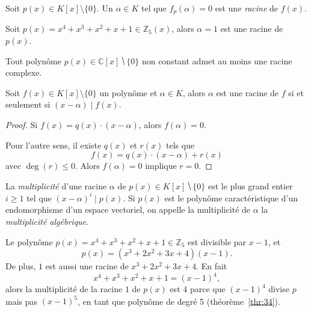 \begin{definition}
  \label{def:31}
  Soit $p(x) \in K[x] \setminus\{0\}$. Un $\alpha \in K$ tel que $f_p(\alpha) = 0$ est une  \emph{racine} de $f(x)$.  
\end{definition}


\begin{example}
  \label{exe:40}
  Soit $p(x) = x^4 + x^3 + x^2 + x + 1 ∈ ℤ_5(x)$, alors $α = 1$ est une racine de $p(x)$. 
\end{example}


\begin{theorem}
  \label{thr:44}
  Tout polynôme $p(x) ∈ℂ[x] ⧹\{0\}$ non constant admet au moins une racine complexe.
\end{theorem}




\begin{theorem}
  \label{thr:35}
  Soit $f(x)∈ K[x] \setminus \{0\}$ un polynôme  et $\alpha \in K$, alors $\alpha$ est une racine de $f$ si et seulement si $(x- \alpha)  \mid f(x)$. 
\end{theorem}

\begin{proof}
  Si $f(x) = q(x) \cdot (x - \alpha)$, alors $f(\alpha) = 0$. 

Pour l'autre sens, il existe $q(x)$ et $r(x)$ tels que
\begin{displaymath}
  f(x) = q(x) \cdot (x - \alpha) + r(x)
\end{displaymath}
avec $\deg(r) \leq 0$. Alors $f(\alpha) = 0$ implique $r=0$. 
\end{proof}


\begin{definition}
  \label{def:41}
  La \emph{multiplicité} d'une racine $α$ de $p(x) ∈ K[x] ⧹\{0\}$ est le plus grand entier $i≥1$ tel que $ (x-α)^i \mid p(x)$. Si $p(x)$ est le polynôme caractéristique d'un endomorphisme d'un espace vectoriel, on appelle la multiplicité de $α$ la \emph{multiplicité algébrique}. 
\end{definition} 


\begin{example}  
  \label{exe:45}
  Le polynôme  $p(x) = x^4 + x^3 + x^2 + x + 1  ∈ℤ_5$  est divisible par $x-1$, et
  \begin{displaymath}
    p(x)  = (x^3 + 2x^2 + 3x + 4)  (x-1). 
  \end{displaymath}
  De plus, $1$ est aussi une racine de $x^3 + 2x^2 + 3x + 4$. En fait 
  \begin{displaymath}
    x^4 + x^3 + x^2 + x + 1 = (x-1)^4,
  \end{displaymath}
  alors la multiplicité de la racine $1$ de $p(x)$ est $4$ parce que $(x-1)^4$ divise $p$ mais pas $(x-1)^5$, en tant que polynôme de degré 5 (théorème~\ref{thr:34}).   
\end{example}




